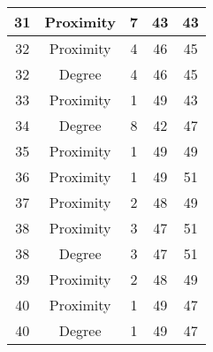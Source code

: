 \documentclass[results.tex]{subfiles}
\begin{document}
\begin{center}
\begin{tabular}{| c || c | c | c | c |}
            \hline
            31                      & Proximity                    & 7                      & 43                      & 43                   \\
            \hline
            32                      & Proximity                    & 4                      & 46                      & 45                   \\
            \hline
            32                      & Degree                       & 4                      & 46                      & 45                   \\
            \hline
            33                      & Proximity                    & 1                      & 49                      & 43                   \\
            \hline
            34                      & Degree                       & 8                      & 42                      & 47                   \\
            \hline
            35                      & Proximity                    & 1                      & 49                      & 49                   \\
            \hline
            36                      & Proximity                    & 1                      & 49                      & 51                   \\
            \hline
            37                      & Proximity                    & 2                      & 48                      & 49                   \\
            \hline
            38                      & Proximity                    & 3                      & 47                      & 51                   \\
            \hline
            38                      & Degree                       & 3                      & 47                      & 51                   \\
            \hline
            39                      & Proximity                    & 2                      & 48                      & 49                   \\
            \hline
            40                      & Proximity                    & 1                      & 49                      & 47                   \\
            \hline
            40                      & Degree                       & 1                      & 49                      & 47                   \\

\end{tabular}
\end{center}
\end{document}
